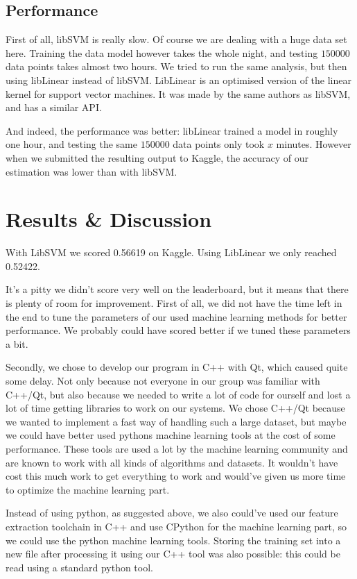 \documentclass[a4paper]{article}
\begin{document}
\subsection{Performance}
First of all, libSVM is really slow. Of course we are dealing with a huge data set here. Training the data model however takes the whole night, and testing $150000$ data points takes almost two hours. We tried to run the same analysis, but then using libLinear instead of libSVM. LibLinear is an optimised version of the linear kernel for support vector machines. It was made by the same authors as libSVM, and has a similar API.

And indeed, the performance was better: libLinear trained a model in roughly one hour, and testing the same $150000$ data points only took $x$ minutes. However when we submitted the resulting output to Kaggle, the accuracy of our estimation was lower than with libSVM.


\section{Results \& Discussion}
With LibSVM we scored 0.56619 on Kaggle. Using LibLinear we only reached 0.52422.

\vspace{1em}

It's a pitty we didn't score very well on the leaderboard, but it means that there is plenty of room for improvement. First of all, we did not have the time left in the end to tune the parameters of our used machine learning methods for better performance. We probably could have scored better if we tuned these parameters a bit.

Secondly, we chose to develop our program in C++ with Qt, which caused quite some delay. Not only because not everyone in our group was familiar with C++/Qt, but also because we needed to write a lot of code for ourself and lost a lot of time getting libraries to work on our systems. We chose C++/Qt because we wanted to implement a fast way of handling such a large dataset, but maybe we could have better used pythons machine learning tools at the cost of some performance. These tools are used a lot by the machine learning community and are known to work with all kinds of algorithms and datasets. It wouldn't have cost this much work to get everything to work and would've given us more time to optimize the machine learning part.

Instead of using python, as suggested above, we also could've used our feature extraction toolchain in C++ and use CPython for the machine learning part, so we could use the python machine learning tools. Storing the training set into a new file after processing it using our C++ tool was also possible: this could be read using a standard python tool.
\end{document}
